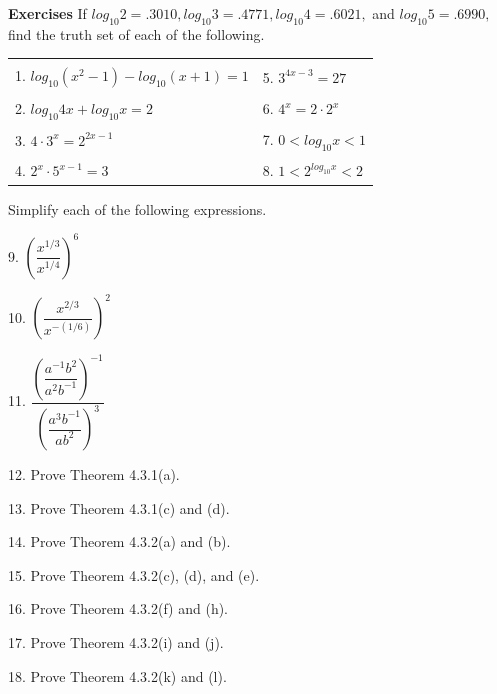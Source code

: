 
\textbf{Exercises} If $log_{10}2 =.3010, log_{10}3 = .4771, log_{10}4 = .6021,$ and $log_{10}5 = .6990,$ find the truth set of each of the following.\nl

\begin{tabular}{l l}
&\\
1. $log_{10}(x^{2} - 1) - log_{10}(x + 1) = 1$  &    5. $3^{4x - 3} = 27$\\
&\\
2. $log_{10}4x + log_{10}x = 2$&     6. $4^{x} = 2\cdot 2^{x}$\\
&\\
3. $4\cdot 3^{x} =2^{2x-1}$&              7. $0 < log_{10}x < 1$\\
&\\
4. $2^{x}\cdot 5^{x-1} = 3$        &          8. $1 <2^{log_{10}x} < 2$\\
\end{tabular}

\newpage

Simplify each of the following expressions.\nl

9. $\left(  \dfrac{x^{1/3}}{x^{1/4}}   \right)^{6}$\nl

10. $\left(\dfrac{x^{2/3}}{x^{-(1/6)}}                \right)^{2}$\nl





11. $\dfrac{\left(\dfrac{a^{-1}b^{2}}{a^{2}b^{-1}}   \right)^{-1}}{\left(\dfrac{a^{3}b^{-1}}{ab^{2}}   \right)^{3}}$\nl

12. Prove Theorem 4.3.1(a). \nl

13. Prove Theorem 4.3.1(c) and (d). \nl

14. Prove Theorem 4.3.2(a) and (b). \nl

15. Prove Theorem 4.3.2(c), (d), and (e). \nl

16. Prove Theorem 4.3.2(f) and (h). \nl

17. Prove Theorem 4.3.2(i) and (j). \nl

18. Prove Theorem 4.3.2(k) and (l). \nl

